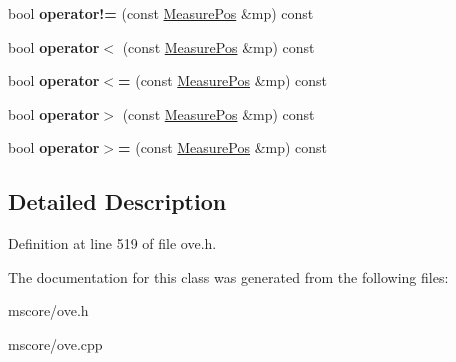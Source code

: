 \begin{DoxyCompactItemize}
bool {\bfseries operator!=} (const \hyperlink{class_o_v_e_1_1_measure_pos}{Measure\+Pos} \&mp) const
\item 
\mbox{\label{class_o_v_e_1_1_measure_pos_a8b6a3d5745c4c0d2a439d1d74f04049e}} 
bool {\bfseries operator$<$} (const \hyperlink{class_o_v_e_1_1_measure_pos}{Measure\+Pos} \&mp) const
\item 
\mbox{\label{class_o_v_e_1_1_measure_pos_ac8873c8ccd3c22bd3955d70d1853c4e3}} 
bool {\bfseries operator$<$=} (const \hyperlink{class_o_v_e_1_1_measure_pos}{Measure\+Pos} \&mp) const
\item 
\mbox{\label{class_o_v_e_1_1_measure_pos_a0efacc8713d41a5d17b4a32b09173fd7}} 
bool {\bfseries operator$>$} (const \hyperlink{class_o_v_e_1_1_measure_pos}{Measure\+Pos} \&mp) const
\item 
\mbox{\label{class_o_v_e_1_1_measure_pos_a5332078ae7c5f02fa293d53aa40367cc}} 
bool {\bfseries operator$>$=} (const \hyperlink{class_o_v_e_1_1_measure_pos}{Measure\+Pos} \&mp) const
\end{DoxyCompactItemize}


\subsection{Detailed Description}


Definition at line 519 of file ove.\+h.



The documentation for this class was generated from the following files\+:\begin{DoxyCompactItemize}
\item 
mscore/ove.\+h\item 
mscore/ove.\+cpp\end{DoxyCompactItemize}
